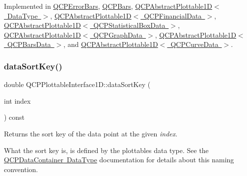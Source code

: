 Implemented in \mbox{\hyperlink{class_q_c_p_error_bars_a7397bc40751c9c6e2ea188895b2152f8}{Q\+C\+P\+Error\+Bars}}, \mbox{\hyperlink{class_q_c_p_bars_a55cdaf565cd3384158d1f7f89533bc2d}{Q\+C\+P\+Bars}}, \mbox{\hyperlink{class_q_c_p_abstract_plottable1_d_a14cf167457cda163575e6eec2a0b178d}{Q\+C\+P\+Abstract\+Plottable1\+D$<$ Data\+Type $>$}}, \mbox{\hyperlink{class_q_c_p_abstract_plottable1_d_a14cf167457cda163575e6eec2a0b178d}{Q\+C\+P\+Abstract\+Plottable1\+D$<$ Q\+C\+P\+Financial\+Data $>$}}, \mbox{\hyperlink{class_q_c_p_abstract_plottable1_d_a14cf167457cda163575e6eec2a0b178d}{Q\+C\+P\+Abstract\+Plottable1\+D$<$ Q\+C\+P\+Statistical\+Box\+Data $>$}}, \mbox{\hyperlink{class_q_c_p_abstract_plottable1_d_a14cf167457cda163575e6eec2a0b178d}{Q\+C\+P\+Abstract\+Plottable1\+D$<$ Q\+C\+P\+Graph\+Data $>$}}, \mbox{\hyperlink{class_q_c_p_abstract_plottable1_d_a14cf167457cda163575e6eec2a0b178d}{Q\+C\+P\+Abstract\+Plottable1\+D$<$ Q\+C\+P\+Bars\+Data $>$}}, and \mbox{\hyperlink{class_q_c_p_abstract_plottable1_d_a14cf167457cda163575e6eec2a0b178d}{Q\+C\+P\+Abstract\+Plottable1\+D$<$ Q\+C\+P\+Curve\+Data $>$}}.

\mbox{\label{class_q_c_p_plottable_interface1_d_afdc92f9f01e7e35f2e96b2ea9dc14ae7}} 
\subsubsection{\texorpdfstring{data\+Sort\+Key()}{dataSortKey()}}
{\footnotesize\ttfamily double Q\+C\+P\+Plottable\+Interface1\+D\+::data\+Sort\+Key (\begin{DoxyParamCaption}\item[{int}]{index }\end{DoxyParamCaption}) const\hspace{0.3cm}{\ttfamily [pure virtual]}}

Returns the sort key of the data point at the given {\itshape index}.

What the sort key is, is defined by the plottable\textquotesingle{}s data type. See the \mbox{\hyperlink{class_q_c_p_data_container_qcpdatacontainer-datatype}{Q\+C\+P\+Data\+Container Data\+Type}} documentation for details about this naming convention. 

